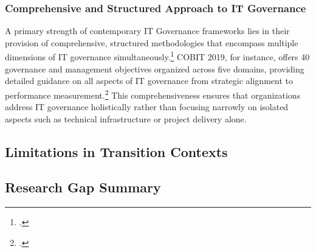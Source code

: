 \subsubsection{Comprehensive and Structured Approach to IT Governance}
\label{subsubsec:ComprehensiveAndStructuredApproachToITGovernance}
A primary strength of contemporary IT Governance frameworks lies in their provision of comprehensive, structured methodologies that encompass multiple dimensions of IT governance simultaneously.\footcite[13]{isacaCOBIT2019Framework2018a}
\ac{COBIT} 2019, for instance, offers 40 governance and management objectives organized across five domains, providing detailed guidance on all aspects of IT governance from strategic alignment to performance measurement.\footcite[17]{isacaCOBIT2019Framework2018a}
This comprehensiveness ensures that organizations address IT governance holistically rather than focusing narrowly on isolated aspects such as technical infrastructure or project delivery alone.
\\


\subsection{Limitations in Transition Contexts}
\label{subsec:LimitationsInTransitionContexts}

\subsection{Research Gap Summary}
\label{subsec:ResearchGapSummary}
